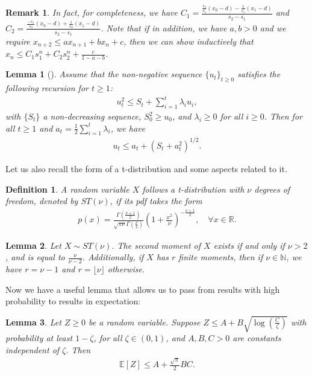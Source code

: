 \documentclass{article}
\newtheorem{lemma}{Lemma}
\newtheorem{definition}{Definition}[section]
\newtheorem{remark}{\textbf{Remark}}
\begin{document}
\begin{remark}
\label{remark:Second_Ord_Ineq_Rmk}
In fact, for completeness, we have $C_1 = \frac{\frac{s_2}{s_1}(x_0 - d) - \frac{1}{s_1}(x_1 - d)}{s_2 - s_1}$ and $C_2 = \frac{\frac{-s_1}{s_2}(x_0 - d) + \frac{1}{s_2}(x_1 - d)}{s_2 - s_1}$. Note that if in addition, we have $a, b > 0$ and we require $x_{n + 2} \leq ax_{n + 1} + bx_n + c$, then we can show inductively that $x_n \leq C_1s_1^n + C_2s_2^n + \frac{c}{1 - a - b}$.
\end{remark}

\begin{lemma}[\cite{Schmidt_2011_Conv}]
\label{lemma:Smooth_GD_Helper}
Assume that the non-negative sequence $\{u_t\}_{t \geq 0}$ satisfies the following recursion for $t \geq 1$:
\begin{align*}
u_t^2 \leq S_t + \sum_{i = 1}^t\lambda_iu_i,
\end{align*}
with $\{S_t\}$ a non-decreasing sequence, $S_0^2 \geq u_0$, and $\lambda_i \geq 0$ for all $i \geq 0$. Then for all $t \geq 1$ and $a_t = \frac{1}{2}\sum_{i = 1}^t\lambda_i$, we have
\begin{align*}
u_t \leq a_t + \left(S_t + a_t^2\right)^{1/2}.
\end{align*}
\end{lemma}

Let us also recall the form of a t-distribution and some aspects related to it.
\begin{definition}
\label{def:t_dist}
A random variable $X$ follows a t-distribution with $\nu$ degrees of freedom, denoted by $ST(\nu)$, if its pdf takes the form
\begin{align*}
p(x) = \frac{\Gamma\left(\frac{\nu + 1}{2}\right)}{\sqrt{\pi\nu}\Gamma\left(\frac{\nu}{2}\right)}\left(1 + \frac{x^2}{\nu}\right)^{-\frac{\nu + 1}{2}}, \quad \forall x \in \mathbb{R}.
\end{align*}
\end{definition}
\begin{lemma}
\label{lemma:t_dist_lemma}
Let $X \sim ST(\nu)$. The second moment of $X$ exists if and only if $\nu > 2$, and is equal to $\frac{\nu}{\nu - 2}$. Additionally, if $X$ has $r$ finite moments, then if $\nu \in \mathbb{N}$, we have $r = \nu - 1$ and $r = \lfloor \nu \rfloor$ otherwise.
\end{lemma}

Now we have a useful lemma that allows us to pass from results with high probability to results in expectation:

\begin{lemma}
\label{lemma:HP_TO_EXP}
Let $Z \geq 0$ be a random variable. Suppose $Z \leq A + B\sqrt{\log\left(\frac{C}{\zeta}\right)}$ with probability at least $1 - \zeta$, for all $\zeta \in (0, 1)$, and $A, B, C > 0$ are constants independent of $\zeta$. Then
\begin{align*}
\mathbb{E}[Z] \leq A + \frac{\sqrt{\pi}}{2}BC.
\end{align*}
\end{lemma}
\end{document}
